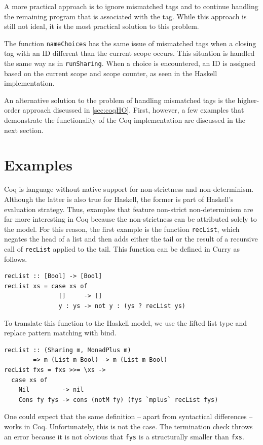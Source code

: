 \documentclass[a4paper, 11pt, fleqn, twoside, abstract=on]{scrreprt}
\newcommand{\hinl}[1]{\texttt{#1}}
\newcommand{\cinl}[1]{\texttt{#1}}
\begin{document}
A more practical approach is to ignore mismatched tags and to continue handling the remaining program that is associated with the tag.
While this approach is still not ideal, it is the most practical solution to this problem.

The function \cinl{nameChoices} has the same issue of mismatched tags when a closing tag with an ID different than the current scope occurs.
This situation is handled the same way as in \cinl{runSharing}.
When a choice is encountered, an ID is assigned based on the current scope and scope counter, as seen in the Haskell implementation.

An alternative solution to the problem of handling mismatched tags is the higher-order approach discussed in \autoref{sec:coqHO}.
First, however, a few examples that demonstrate the functionality of the Coq implementation are discussed in the next section.

\section{Examples}
Coq is language without native support for non-strictness and non-determinism.
Although the latter is also true for Haskell, the former is part of Haskell's evaluation strategy.
Thus, examples that feature non-strict non-determinism are far more interesting in Coq because the non-strictness can be attributed solely to the model.
For this reason, the first example is the function \hinl{recList}, which negates the head of a list and then adds either the tail or the result of a recursive call of \hinl{recList} applied to the tail.
This function can be defined in Curry as follows. 

\begin{verbatim}
recList :: [Bool] -> [Bool]
recList xs = case xs of
               []     -> []
               y : ys -> not y : (ys ? recList ys)
\end{verbatim}
\noindent
To translate this function to the Haskell model, we use the lifted list type and replace pattern matching with bind.

\begin{verbatim}
recList :: (Sharing m, MonadPlus m) 
        => m (List m Bool) -> m (List m Bool)
recList fxs = fxs >>= \xs ->
  case xs of
    Nil         -> nil
    Cons fy fys -> cons (notM fy) (fys `mplus` recList fys)
\end{verbatim}

One could expect that the same definition -- apart from syntactical differences -- works in Coq.
Unfortunately, this is not the case.
The termination check throws an error because it is not obvious that \hinl{fys} is a structurally smaller than \hinl{fxs}.
\end{document}
